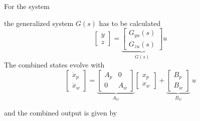\begin{examplesection}
    For the system
    \begin{center}
        
    \end{center}
    the generalized system $G(s)$ has to be calculated
    \begin{equation*}
        \begin{bmatrix}
            y \\
            z
        \end{bmatrix}
        = \underbrace{\begin{bmatrix}
                G_{yu}(s) \\
                G_{zu}(s)
            \end{bmatrix}}_{G(s)} u
    \end{equation*}
    The combined states evolve with
    \begin{equation*}
        \begin{bmatrix}
            \dot{x}_p \\
            \dot{x}_w
        \end{bmatrix}
        = \underbrace{\begin{bmatrix}
                A_p & 0   \\
                0   & A_w
            \end{bmatrix}}_{A_G}
        \begin{bmatrix}
            x_p \\
            x_w
        \end{bmatrix}
        + \underbrace{\begin{bmatrix}
                B_p \\
                B_w
            \end{bmatrix}}_{B_G} \: u
    \end{equation*}

    and the combined output is given by


\end{examplesection}
